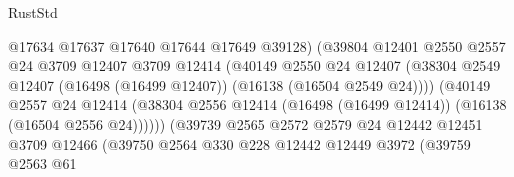 \begin{lexlean}{RustStd}
\begin{coremodule}
                                          @17634
                                          @17637
                                          @17640
                                          @17644
                                          @17649
                                          @39128)
                                        (@39804
                                          @12401
                                          @2550
                                          @2557
                                          @24
                                          @3709
                                          @12407
                                          @3709
                                          @12414
                                          (@40149
                                            @2550
                                            @24
                                            @12407
                                            (@38304
                                              @2549
                                              @12407
                                              (@16498 (@16499 @12407))
                                              (@16138 (@16504 @2549 @24))))
                                          (@40149
                                            @2557
                                            @24
                                            @12414
                                            (@38304
                                              @2556
                                              @12414
                                              (@16498 (@16499 @12414))
                                              (@16138 (@16504 @2556 @24))))))
                                      (@39739
                                        @2565
                                        @2572
                                        @2579
                                        @24
                                        @12442
                                        @12451
                                        @3709
                                        @12466
                                        (@39750
                                          @2564
                                          @330
                                          @228
                                          @12442
                                          @12449
                                          @3972
                                          (@39759
                                            @2563
                                            @61

\end{coremodule}
\end{lexlean}
